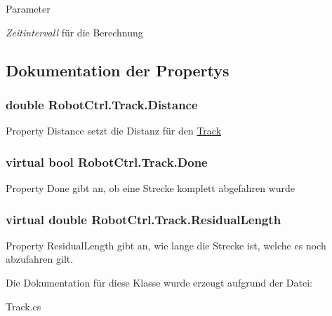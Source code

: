 \begin{DoxyParams}{Parameter}
\item[{\em Zeitintervall}]f\"{u}r die Berechnung \end{DoxyParams}


\subsection{Dokumentation der Propertys}
\hypertarget{class_robot_ctrl_1_1_track_a42bb46c8d3c2a540b1d3d25e65b1a07c}{
\subsubsection[{Distance}]{\setlength{\rightskip}{0pt plus 5cm}double RobotCtrl.Track.Distance}}
\label{class_robot_ctrl_1_1_track_a42bb46c8d3c2a540b1d3d25e65b1a07c}
Property Distance setzt die Distanz f\"{u}r den \hyperlink{class_robot_ctrl_1_1_track}{Track} \hypertarget{class_robot_ctrl_1_1_track_ad1c4864f7171475914ef5c0111a0d901}{
\subsubsection[{Done}]{\setlength{\rightskip}{0pt plus 5cm}virtual bool RobotCtrl.Track.Done}}
\label{class_robot_ctrl_1_1_track_ad1c4864f7171475914ef5c0111a0d901}
Property Done gibt an, ob eine Strecke komplett abgefahren wurde \hypertarget{class_robot_ctrl_1_1_track_a4f01da358c21733d43ac272d3fb549cc}{
\subsubsection[{ResidualLength}]{\setlength{\rightskip}{0pt plus 5cm}virtual double RobotCtrl.Track.ResidualLength}}
\label{class_robot_ctrl_1_1_track_a4f01da358c21733d43ac272d3fb549cc}
Property ResidualLength gibt an, wie lange die Strecke ist, welche es noch abzufahren gilt. 

Die Dokumentation für diese Klasse wurde erzeugt aufgrund der Datei:\begin{DoxyCompactItemize}
\item 
Track.cs\end{DoxyCompactItemize}
